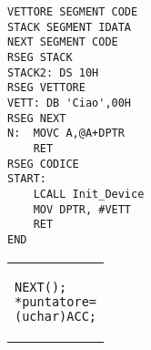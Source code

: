 \documentclass[main.tex]{subfiles}
\begin{document}
\begin{minipage}{0.49\textwidth}
\begin{lstlisting}[caption=Vettore in Assembly]
VETTORE SEGMENT CODE
STACK SEGMENT IDATA
NEXT SEGMENT CODE
RSEG STACK
STACK2: DS 10H
RSEG VETTORE
VETT: DB 'Ciao',00H
RSEG NEXT
N:	MOVC A,@A+DPTR
    RET
RSEG CODICE
START:
	LCALL Init_Device
	MOV DPTR, #VETT
	RET
END
\end{lstlisting}
\end{minipage}%
\hfill
\begin{minipage}{0.49\textwidth}
\begin{tabular}{|p{}}
\begin{lstlisting}[caption=codice in C]
NEXT();
*puntatore=
(uchar)ACC;
\end{lstlisting}
\end{tabular}
\end{minipage}%
\end{document}
